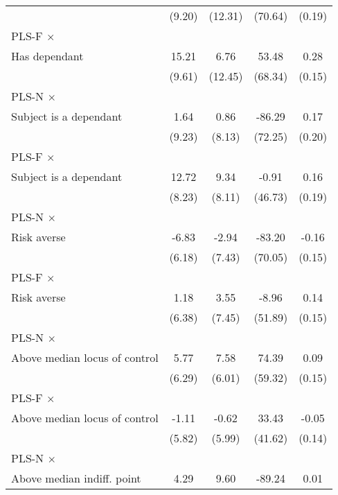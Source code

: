 \begin{table}[htbp]
\begin{tabular}{l*{4}{c}}
                &   (9.20)         &  (12.31)         &  (70.64)         &   (0.19)         \\
\addlinespace
PLS-F $\times$ \\ Has dependant&    15.21         &     6.76         &    53.48         &     0.28\sym{*}  \\
                &   (9.61)         &  (12.45)         &  (68.34)         &   (0.15)         \\
\addlinespace
PLS-N $\times$ \\ Subject is a dependant&     1.64         &     0.86         &   -86.29         &     0.17         \\
                &   (9.23)         &   (8.13)         &  (72.25)         &   (0.20)         \\
\addlinespace
PLS-F $\times$ \\ Subject is a dependant&    12.72         &     9.34         &    -0.91         &     0.16         \\
                &   (8.23)         &   (8.11)         &  (46.73)         &   (0.19)         \\
\addlinespace
PLS-N $\times$ \\ Risk averse&    -6.83         &    -2.94         &   -83.20         &    -0.16         \\
                &   (6.18)         &   (7.43)         &  (70.05)         &   (0.15)         \\
\addlinespace
PLS-F $\times$ \\ Risk averse&     1.18         &     3.55         &    -8.96         &     0.14         \\
                &   (6.38)         &   (7.45)         &  (51.89)         &   (0.15)         \\
\addlinespace
PLS-N $\times$ \\ Above median locus of control&     5.77         &     7.58         &    74.39         &     0.09         \\
                &   (6.29)         &   (6.01)         &  (59.32)         &   (0.15)         \\
\addlinespace
PLS-F $\times$ \\ Above median locus of control&    -1.11         &    -0.62         &    33.43         &    -0.05         \\
                &   (5.82)         &   (5.99)         &  (41.62)         &   (0.14)         \\
\addlinespace
PLS-N $\times$ \\ Above median indiff. point&     4.29         &     9.60         &   -89.24\sym{*}  &     0.01         \\

\end{tabular}
\end{table}
